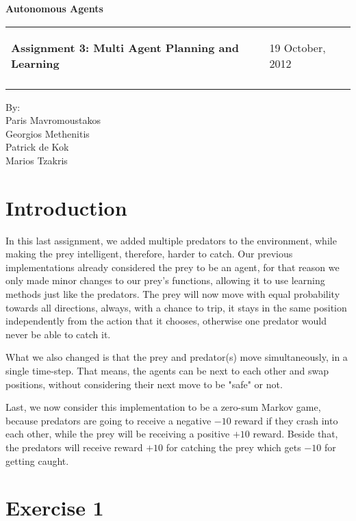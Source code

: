 \documentclass[a4paper,11pt]{article}
\makeatletter
\newcommand{\resheading}[1]{{\large \colorbox{mygrey}{\begin{minipage}{\textwidth}{\textbf{#1 \vphantom{p\^{E}}}}\end{minipage}}}}
\newcommand{\mywebheader}{
  \begin{tabular}{@{}p{5in}p{4in}}
  {\resheading{Assignment 3: Multi Agent Planning and Learning}} & {\Large 19 October, 2012}\\\vspace{0.2cm}
  \end{tabular}}
\makeatother
\begin{document}
\begin{center}
{\LARGE \textbf{Autonomous Agents}}\\ [1em]
\end{center}
\mywebheader

\begin{center}
{\Large By:} \\ \vspace{0.1cm}
{\Large Paris Mavromoustakos} \\  \vspace{0.1cm}
{\Large Georgios Methenitis} \\ \vspace{0.1cm}
{\Large Patrick de Kok} \\ \vspace{0.1cm}
{\Large Marios Tzakris}
\end{center}




\section{Introduction}

In this last assignment, we added multiple predators to the environment, while making the prey intelligent, therefore, harder to catch. Our previous implementations already considered the prey to be an agent, for that reason we only made minor changes to our prey's functions, allowing it to use learning methods just like the predators. The prey will now move with equal probability towards all directions, always, with a chance to trip, it stays in the same position independently from the action that it chooses, otherwise one predator would never be able to catch it.

What we also changed is that the prey and predator(s) move simultaneously, in a single time-step. That means, the agents can be next to each other and swap positions, without considering their next move to be "safe" or not.

Last, we now consider this implementation to be a zero-sum Markov game, because predators are going to receive a negative $-10$ reward if they crash into each other, while the prey will be receiving a positive $+10$ reward. Beside that, the predators will receive reward $+10$ for catching the prey which gets $-10$ for getting caught.



\section{Exercise 1}
\end{document}
